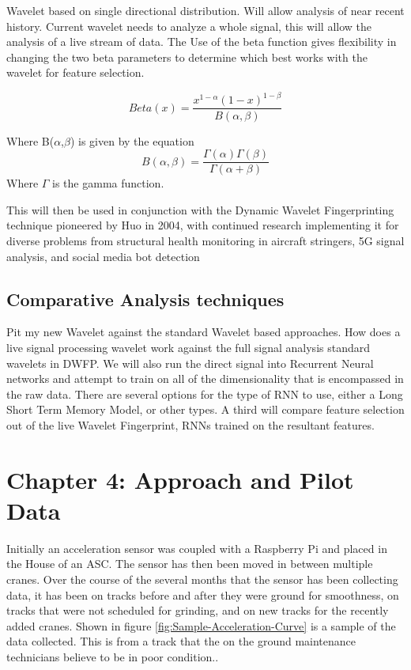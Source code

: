 \documentclass[journal=jacsat,manuscript=article]{achemso}
\begin{document}
Wavelet based on single directional distribution. Will allow analysis of near recent history. Current wavelet needs to analyze a whole signal, this will allow the analysis of a live stream of data.  The Use of the beta function gives flexibility in changing the two beta parameters to determine which best works with the wavelet for feature selection.

\begin{equation}
Beta(x) = \frac{x^{1-\alpha}(1-x)^{1-\beta}}{B(\alpha,\beta)}
\end{equation}

Where B($\alpha$,$\beta$) is given by the equation
\begin{equation}
B(\alpha,\beta) = \frac{\Gamma(\alpha)\Gamma(\beta)}{\Gamma(\alpha+\beta)}
\end{equation}
Where $\Gamma$ is the gamma function.

This will then be used in conjunction with the Dynamic Wavelet Fingerprinting technique pioneered by Huo in 2004, with continued research implementing it for diverse problems from structural health monitoring in aircraft stringers, 5G signal analysis, and social media bot detection


\subsection{Comparative Analysis techniques}
Pit my new Wavelet against the standard Wavelet based approaches.  How does a live signal processing wavelet work against the full signal analysis standard wavelets in DWFP.  We will also run the direct signal into Recurrent Neural networks and attempt to train on all of the dimensionality that is encompassed in the raw data.  There are several options for the type of RNN to use, either a Long Short Term Memory Model, or other types.  A third will compare feature selection out of the live Wavelet Fingerprint, RNNs trained on the resultant features. 

\pagebreak
\section{Chapter 4: Approach and Pilot Data}

Initially an acceleration sensor was coupled with a Raspberry Pi and placed in the House of an ASC. The sensor has then been moved in between multiple cranes. Over the course of the several months that the sensor has been collecting data, it has been on tracks before and after they were ground for smoothness, on tracks that were not scheduled for grinding, and on new tracks for the recently added cranes.  Shown in figure \ref{fig:Sample-Acceleration-Curve} is a sample of the data collected.  This is from a track that the on the ground maintenance technicians believe to be in poor condition.. 
\end{document}
